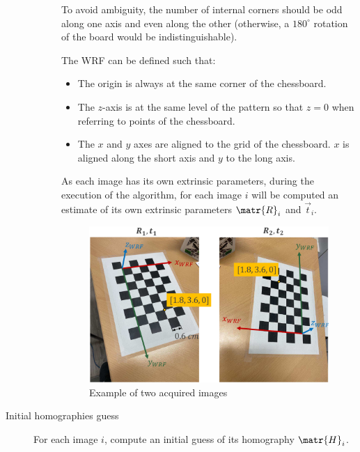 \begin{description}
\begin{description}
                \begin{remark}
                    To avoid ambiguity, the number of internal corners should be odd along one axis and even along the other
                    (otherwise, a $180^\circ$ rotation of the board would be indistinguishable).
                \end{remark}

                The WRF can be defined such that:
                \begin{itemize}
                    \item The origin is always at the same corner of the chessboard.
                    \item The $z$-axis is at the same level of the pattern so that $z=0$ when referring to points of the chessboard.
                    \item The $x$ and $y$ axes are aligned to the grid of the chessboard. $x$ is aligned along the short axis and $y$ to the long axis.
                \end{itemize}

                \begin{remark}
                    As each image has its own extrinsic parameters,
                    during the execution of the algorithm, for each image $i$ will be computed
                    an estimate of its own extrinsic parameters $\matr{R}_i$ and $\vec{t}_i$.
                \end{remark}

                \begin{figure}[H]
                    \centering
                    \includegraphics[width=0.45\linewidth]{./img/_zhang_image_acquistion.pdf}
                    \caption{Example of two acquired images}
                \end{figure}
        \end{description}

    \item[Initial homographies guess]
        For each image $i$, compute an initial guess of its homography $\matr{H}_i$.


\end{description}
